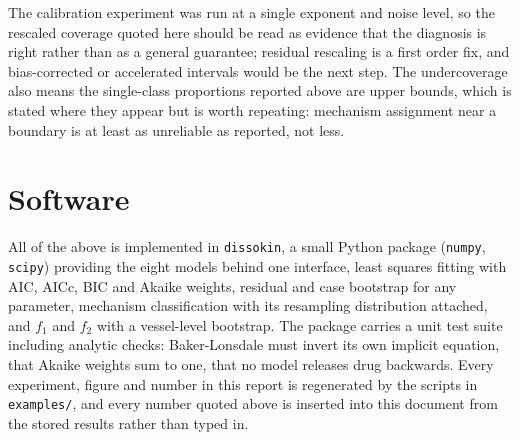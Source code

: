 \documentclass[11pt,a4paper]{article}
\begin{document}
The calibration experiment was run at a single exponent and noise level, so
the rescaled coverage quoted here should be read as evidence that the
diagnosis is right rather than as a general guarantee; residual rescaling is a
first order fix, and bias-corrected or accelerated intervals would be the next
step. The undercoverage also means the single-class proportions reported above
are upper bounds, which is stated where they appear but is worth repeating:
mechanism assignment near a boundary is at least as unreliable as reported,
not less.

\section{Software}

All of the above is implemented in \texttt{dissokin}, a small Python package
(\texttt{numpy}, \texttt{scipy}) providing the eight models behind one
interface, least squares fitting with AIC, AICc, BIC and Akaike weights,
residual and case bootstrap for any parameter, mechanism classification with
its resampling distribution attached, and $f_1$ and $f_2$ with a
vessel-level bootstrap. The package carries a unit test suite including
analytic checks: Baker-Lonsdale must invert its own implicit equation,
that Akaike weights sum to one, that no model releases drug backwards. Every
experiment, figure and number in this report is regenerated by the scripts in
\texttt{examples/}, and every number quoted above is inserted into this
document from the stored results rather than typed in.
\end{document}
